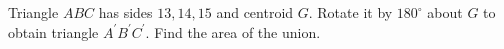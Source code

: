 Triangle $ABC$ has sides $13,14,15$ and centroid $G$. Rotate it by $180^\circ$ about $G$ to obtain triangle $A^{\prime} B^{\prime} C^{\prime}$. Find the area of the union.
